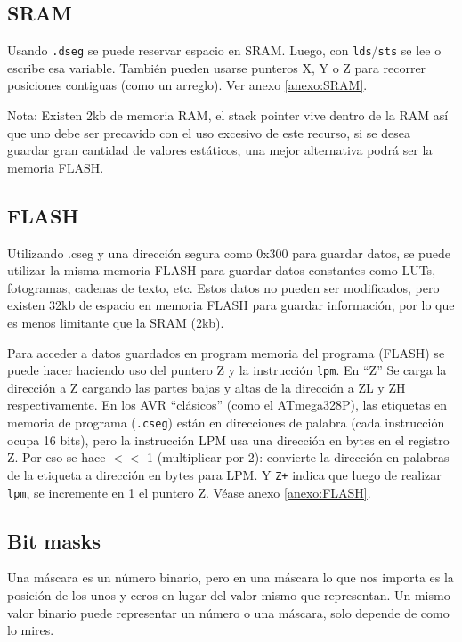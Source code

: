 \subsection{SRAM}

Usando \texttt{.dseg} se puede reservar espacio en SRAM. Luego, con \texttt{lds}/\texttt{sts} se lee o escribe esa variable. También pueden usarse punteros X, Y o Z para recorrer posiciones contiguas (como un arreglo). Ver anexo \ref{anexo:SRAM}.

Nota: Existen 2kb de memoria RAM, el stack pointer vive dentro de la RAM así que uno debe ser precavido con el uso excesivo de este recurso, si se desea guardar gran cantidad de valores estáticos, una mejor alternativa podrá ser la memoria FLASH.

\subsection{FLASH}

Utilizando .cseg y una dirección segura como 0x300 para guardar datos, se puede utilizar la misma memoria FLASH para guardar datos constantes como LUTs, fotogramas, cadenas de texto, etc. Estos datos no pueden ser modificados, pero existen 32kb de espacio en memoria FLASH para guardar información, por lo que es menos limitante que la SRAM (2kb).

Para acceder a datos guardados en program memoria del programa (FLASH) se puede hacer haciendo uso del puntero Z y la instrucción \texttt{lpm}. En ``Z'' Se carga la dirección a Z cargando las partes bajas y altas de la dirección a ZL y ZH respectivamente. En los AVR  ``clásicos'' (como el ATmega328P), las etiquetas en memoria de programa (\texttt{.cseg}) están en direcciones de palabra (cada instrucción ocupa 16 bits), pero la instrucción LPM usa una dirección en bytes en el registro Z. Por eso se hace $<$$<$ 1 (multiplicar por 2): convierte la dirección en palabras de la etiqueta a dirección en bytes para LPM. Y \texttt{Z+} indica que luego de realizar \texttt{lpm}, se incremente en 1 el puntero Z. Véase anexo \ref{anexo:FLASH}.

\subsection{Bit masks}
Una máscara es un número binario, pero en una máscara lo que nos importa es la posición de los unos y ceros en lugar del valor mismo que representan. Un mismo valor binario puede representar un número o una máscara, solo depende de como lo mires.  

